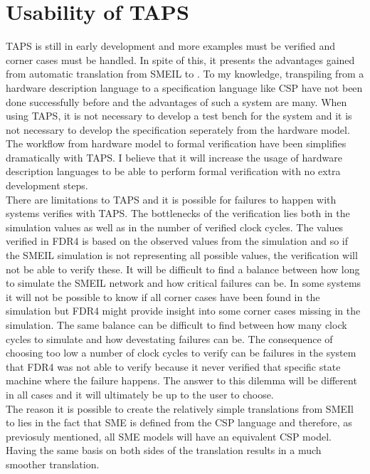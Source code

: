 
\section{Usability of TAPS}
TAPS is still in early development and more examples must be verified and corner cases must be handled. In spite of this, it presents the advantages gained from automatic translation from SMEIL to \cspm{}. To my knowledge, transpiling from a hardware description language to a specification language like CSP have not been done successfully before and the advantages of such a system are many. When using TAPS, it is not necessary to develop a test bench for the system and it is not necessary to develop the specification seperately from the hardware model. The workflow from hardware model to formal verification have been simplifies dramatically with TAPS. I believe that it will increase the usage of hardware description languages to be able to perform formal verification with no extra development steps. \\

There are limitations to TAPS and it is possible for failures to happen with systems verifies with TAPS. The bottlenecks of the verification lies both in the simulation values as well as in the number of verified clock cycles. The values verified in FDR4 is based on the observed values from the simulation and so if the SMEIL simulation is not representing all possible values, the verification will not be able to verify these. It will be difficult to find a balance between how long to simulate the SMEIL network and how critical failures can be. In some systems it will not be possible to know if all corner cases have been found in the simulation but FDR4 might provide insight into some corner cases missing in the simulation. The same balance can be difficult to find between how many clock cycles to simulate and how devestating failures can be. The consequence of choosing too low a number of clock cycles to verify can be failures in the system that FDR4 was not able to verify because it never verified that specific state machine where the failure happens.
The answer to this dilemma will be different in all cases and it will ultimately be up to the user to choose. \\

The reason it is possible to create the relatively simple translations from SMEIl to \cspm{} lies in the fact that SME is defined from the CSP language and therefore, as previosuly mentioned, all SME models will have an equivalent CSP model. Having the same basis on both sides of the translation results in a much smoother translation.

